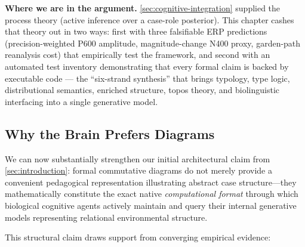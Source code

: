 \documentclass[
]{article}
\begin{document}
\textbf{Where we are in the argument.}
\autoref{sec:cognitive-integration} supplied the process theory (active
inference over a case-role posterior). This chapter cashes that theory
out in two ways: first with three falsifiable ERP predictions
(precision-weighted P600 amplitude, magnitude-change N400 proxy,
garden-path reanalysis cost) that empirically test the framework, and
second with an automated test inventory demonstrating that every formal
claim is backed by executable code --- the ``six-strand synthesis'' that
brings typology, type logic, distributional semantics, enriched
structure, topos theory, and biolinguistic interfacing into a single
generative model.

\subsection{Why the Brain Prefers
Diagrams}\label{why-the-brain-prefers-diagrams}

We can now substantially strengthen our initial architectural claim from
\autoref{sec:introduction}: formal commutative diagrams do not merely
provide a convenient pedagogical representation illustrating abstract
case structure---they mathematically constitute the exact native
\emph{computational format} through which biological cognitive agents
actively maintain and query their internal generative models
representing relational environmental structure.

This structural claim draws support from converging empirical evidence:
\end{document}

